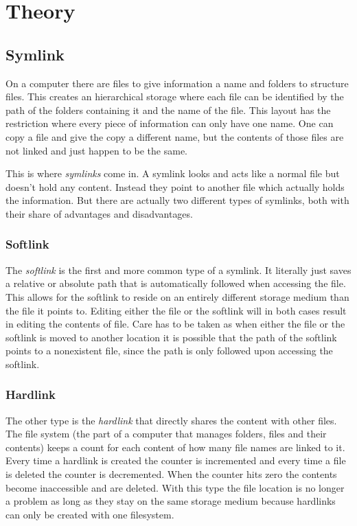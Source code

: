 \section{Theory}
\def\kapitelautor{Clemens Stadlbauer}

\subsection{Symlink}%
\label{subsec:theory:symlink}

On a computer there are files to give information a name and folders to
structure files. This creates an hierarchical storage where each file can be
identified by the path of the folders containing it and the name of the file.
This layout has the restriction where every piece of information can only have
one name. One can copy a file and give the copy a different name, but the
contents of those files are not linked and just happen to be the same.

This is where \emph{symlinks} come in. A symlink looks and acts like a normal
file but doesn't hold any content. Instead they point to another file which
actually holds the information. But there are actually two different types of
symlinks, both with their share of advantages and disadvantages.

\subsubsection{Softlink}%
\label{theory:softlink}

The \emph{softlink} is the first and more common type of a symlink. It
literally just saves a relative or absolute path that is automatically followed
when accessing the file. This allows for the softlink to reside on an entirely
different storage medium than the file it points to. Editing either the file or
the softlink will in both cases result in editing the contents of file. Care
has to be taken as when either the file or the softlink is moved to another
location it is possible that the path of the softlink points to a nonexistent
file, since the path is only followed upon accessing the softlink.

\subsubsection{Hardlink}%
\label{theory:hardlink}

The other type is the \emph{hardlink} that directly shares the content with
other files. The file system (the part of a computer that manages folders, files
and their contents) keeps a count for each content of how many file names are
linked to it. Every time a hardlink is created the counter is incremented and
every time a file is deleted the counter is decremented. When the counter hits
zero the contents become inaccessible and are deleted. With this type the file
location is no longer a problem as long as they stay on the same storage medium
because hardlinks can only be created with one filesystem.

